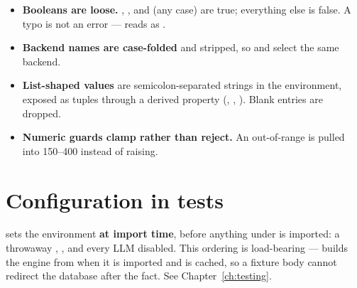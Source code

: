 \begin{itemize}
\item \textbf{Booleans are loose.} , ,  and
 (any case) are true; everything else is false. A typo is not an error
---  reads as .
\item \textbf{Backend names are case-folded} and stripped, so  and
 select the same backend.
\item \textbf{List-shaped values} are semicolon-separated strings in the
environment, exposed as tuples through a derived property
(, ,
). Blank entries are dropped.
\item \textbf{Numeric guards clamp rather than reject.} An out-of-range
 is pulled into 150--400 instead of raising.
\end{itemize}

\section{Configuration in tests}

 sets the environment \textbf{at import time}, before
anything under  is imported: a throwaway ,
, and every LLM disabled. This ordering is
load-bearing ---  builds the engine from
 when it is imported and  is cached, so a
fixture body cannot redirect the database after the fact. See
Chapter~\ref{ch:testing}.
